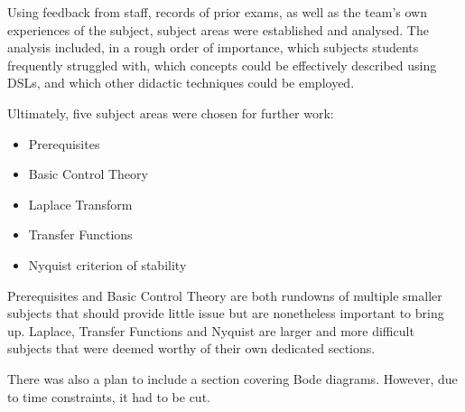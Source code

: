 Using feedback from staff, records of prior exams, as well as the team's own experiences of the subject, subject areas were established and analysed. The analysis included, in a rough order of importance, which subjects students frequently struggled with, which concepts could be effectively described using \gls{DSL}s, and which other \gls{didactic} techniques could be employed.

Ultimately, five subject areas were chosen for further work:
\begin{itemize}
    \item Prerequisites
    \item Basic Control Theory
    \item Laplace Transform
    \item Transfer Functions
    \item Nyquist criterion of stability
\end{itemize}

Prerequisites and Basic Control Theory are both rundowns of multiple smaller subjects that should provide little issue but are nonetheless important to bring up. Laplace, Transfer Functions and Nyquist are larger and more difficult subjects that were deemed worthy of their own dedicated sections.

There was also a plan to include a section covering Bode diagrams. However, due to time constraints, it had to be cut.

